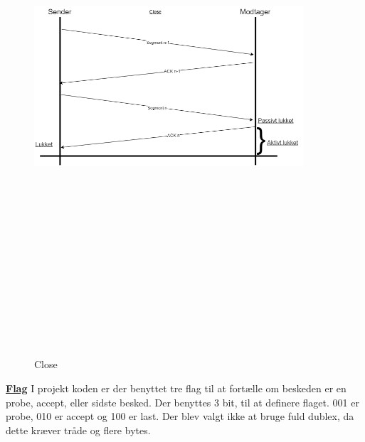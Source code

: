 \begin{figure}[ht]
	\centering
	\includegraphics[width=10cm,height=20cm,keepaspectratio]{pictures/Close.png}
	\caption{Close}
	\label{fig:close}
\end{figure}

\hfill \break
\hfill \break
\hfill \break
\hfill \break
\underline{\textbf{Flag}}
\newline
I projekt koden er der benyttet tre flag til at fortælle om beskeden er en probe, accept, eller sidste besked.
Der benyttes 3 bit, til at definere flaget. 001 er probe, 010 er accept og 100 er last.
\hfill \break
\newline
Der blev valgt ikke at bruge fuld dublex, da dette kræver tråde og flere bytes.